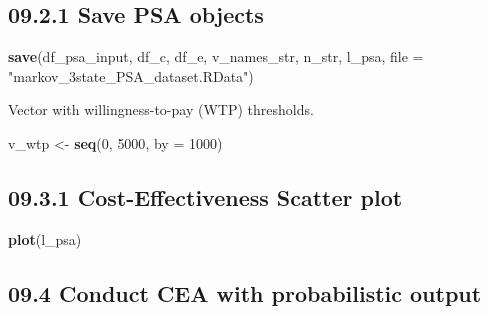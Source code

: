 \documentclass[]{article}
\newenvironment{Shaded}{\begin{snugshade}}{\end{snugshade}}
\newcommand{\KeywordTok}[1]{\textcolor[rgb]{0.13,0.29,0.53}{\textbf{#1}}}
\newcommand{\DataTypeTok}[1]{\textcolor[rgb]{0.13,0.29,0.53}{#1}}
\newcommand{\DecValTok}[1]{\textcolor[rgb]{0.00,0.00,0.81}{#1}}
\newcommand{\StringTok}[1]{\textcolor[rgb]{0.31,0.60,0.02}{#1}}
\newcommand{\NormalTok}[1]{#1}
\begin{document}
\subsection{09.2.1 Save PSA objects}\label{save-psa-objects}

\begin{Shaded}
\begin{Highlighting}[]
\KeywordTok{save}\NormalTok{(df_psa_input, df_c, df_e, v_names_str, n_str, l_psa,}
     \DataTypeTok{file =} \StringTok{"markov_3state_PSA_dataset.RData"}\NormalTok{)}
\end{Highlighting}
\end{Shaded}

Vector with willingness-to-pay (WTP) thresholds.

\begin{Shaded}
\begin{Highlighting}[]
\NormalTok{v_wtp <-}\StringTok{ }\KeywordTok{seq}\NormalTok{(}\DecValTok{0}\NormalTok{, }\DecValTok{5000}\NormalTok{, }\DataTypeTok{by =} \DecValTok{1000}\NormalTok{)}
\end{Highlighting}
\end{Shaded}

\subsection{09.3.1 Cost-Effectiveness Scatter
plot}\label{cost-effectiveness-scatter-plot}

\begin{Shaded}
\begin{Highlighting}[]
\KeywordTok{plot}\NormalTok{(l_psa)}
\end{Highlighting}
\end{Shaded}

\subsection{09.4 Conduct CEA with probabilistic
output}\label{conduct-cea-with-probabilistic-output}
\end{document}
